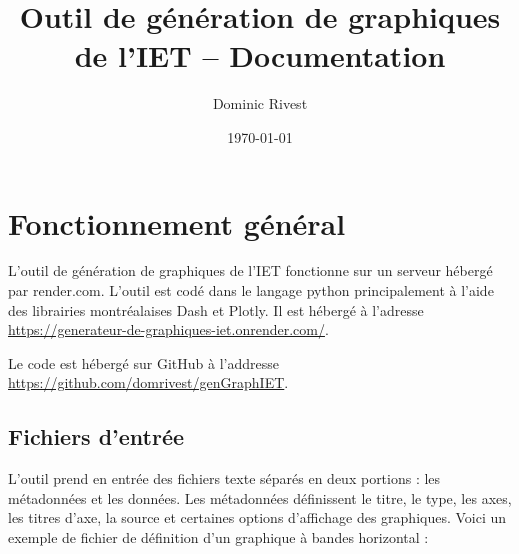 \documentclass[11pt]{article}
\title{Outil de génération de graphiques de l'IET -- Documentation}
\author{ Dominic Rivest }
\date{\today}
\begin{document}
\maketitle	

\tableofcontents
\pagebreak


\section{Fonctionnement général}

L'outil de génération de graphiques de l'IET fonctionne sur un serveur hébergé par render.com. L'outil est codé dans le langage python principalement à l'aide des librairies montréalaises Dash et Plotly. Il est hébergé à l'adresse \href{https://generateur-de-graphiques-iet.onrender.com/}{https://generateur-de-graphiques-iet.onrender.com/}.

Le code est hébergé sur GitHub à l'addresse \href{https://github.com/domrivest/genGraphIET}{https://github.com/domrivest/genGraphIET}.

\subsection{Fichiers d'entrée}
L'outil prend en entrée des fichiers texte séparés en deux portions : les métadonnées et les données. Les métadonnées définissent le titre, le type, les axes, les titres d'axe, la source et certaines options d'affichage des graphiques. Voici un exemple de fichier de définition d'un graphique à bandes horizontal : 
\end{document}
